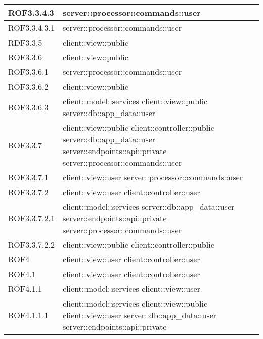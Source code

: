 \begin{center}
\begin{longtable}{| p{4cm} | p{8cm} |}
\hline
ROF3.3.4.3 & server::processor::commands::user \\
\hline
ROF3.3.4.3.1 & server::processor::commands::user \\
\hline
RDF3.3.5 & client::view::public \\
\hline
ROF3.3.6 & client::view::public \\
\hline
ROF3.3.6.1 & server::processor::commands::user \\
\hline
ROF3.3.6.2 & client::view::public \\
\hline
ROF3.3.6.3 & client::model::services \newline client::view::public \newline server::db::app\_data::user \\
\hline
ROF3.3.7 & client::view::public \newline client::controller::public \newline server::db::app\_data::user \newline server::endpoints::api::private \newline server::processor::commands::user \\
\hline
ROF3.3.7.1 & client::view::user \newline server::processor::commands::user \\
\hline
ROF3.3.7.2 & client::view::user \newline client::controller::user \\
\hline
ROF3.3.7.2.1 & client::model::services \newline server::db::app\_data::user \newline server::endpoints::api::private \newline server::processor::commands::user \\
\hline
ROF3.3.7.2.2 & client::view::public \newline client::controller::public \\
\hline
ROF4 & client::view::user \newline client::controller::user \\
\hline
ROF4.1 & client::view::user \newline client::controller::user \\
\hline
ROF4.1.1 & client::model::services \newline client::view::user \\
\hline
ROF4.1.1.1 & client::model::services \newline client::view::public \newline client::view::user \newline server::db::app\_data::user \newline server::endpoints::api::private \\

\end{longtable}
\end{center}
